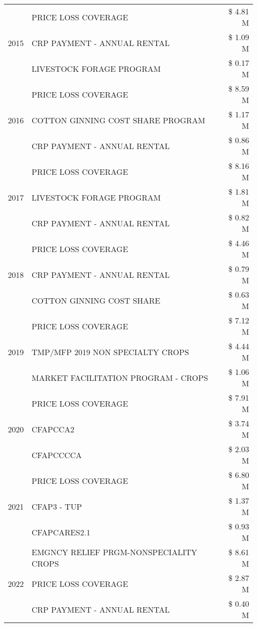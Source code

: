 \begin{tabular}{llr}
\cline{1-3}
\multirow[t]{3}{*}{2015} & PRICE LOSS COVERAGE & \$ 4.81 M \\
 & CRP PAYMENT - ANNUAL RENTAL & \$ 1.09 M \\
 & LIVESTOCK FORAGE PROGRAM & \$ 0.17 M \\
\cline{1-3}
\multirow[t]{3}{*}{2016} & PRICE LOSS COVERAGE & \$ 8.59 M \\
 & COTTON GINNING COST SHARE PROGRAM & \$ 1.17 M \\
 & CRP PAYMENT - ANNUAL RENTAL & \$ 0.86 M \\
\cline{1-3}
\multirow[t]{3}{*}{2017} & PRICE LOSS COVERAGE & \$ 8.16 M \\
 & LIVESTOCK FORAGE PROGRAM & \$ 1.81 M \\
 & CRP PAYMENT - ANNUAL RENTAL & \$ 0.82 M \\
\cline{1-3}
\multirow[t]{3}{*}{2018} & PRICE LOSS COVERAGE & \$ 4.46 M \\
 & CRP PAYMENT - ANNUAL RENTAL & \$ 0.79 M \\
 & COTTON GINNING COST SHARE & \$ 0.63 M \\
\cline{1-3}
\multirow[t]{3}{*}{2019} & PRICE LOSS COVERAGE & \$ 7.12 M \\
 & TMP/MFP 2019 NON SPECIALTY CROPS & \$ 4.44 M \\
 & MARKET FACILITATION PROGRAM - CROPS & \$ 1.06 M \\
\cline{1-3}
\multirow[t]{3}{*}{2020} & PRICE LOSS COVERAGE & \$ 7.91 M \\
 & CFAPCCA2 & \$ 3.74 M \\
 & CFAPCCCCA & \$ 2.03 M \\
\cline{1-3}
\multirow[t]{3}{*}{2021} & PRICE LOSS COVERAGE & \$ 6.80 M \\
 & CFAP3 - TUP & \$ 1.37 M \\
 & CFAPCARES2.1 & \$ 0.93 M \\
\cline{1-3}
\multirow[t]{3}{*}{2022} & EMGNCY RELIEF PRGM-NONSPECIALITY CROPS & \$ 8.61 M \\
 & PRICE LOSS COVERAGE & \$ 2.87 M \\
 & CRP PAYMENT - ANNUAL RENTAL & \$ 0.40 M \\
\cline{1-3}
\bottomrule
\end{tabular}
